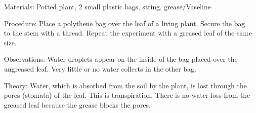 \begin{multicols}{2}
\begin{description*}
\item[Materials:]{Potted plant, 2 small plastic bags, string, grease/Vaseline}
\item[Procedure:]{Place a polythene bag over the leaf of a living plant. Secure the bag to the stem with a
thread. Repeat the experiment with a greased leaf of the same size.}
\item[Observations:]{Water droplets appear on the inside of the bag placed over the ungreased leaf. Very little
or no water collects in the other bag.}
\item[Theory:]{Water, which is absorbed from the soil by the plant, is lost through the pores (stomata) of the leaf. This is transpiration. There is no water loss from the greased leaf because the
grease blocks the pores.}
\end{description*}



\end{multicols}

\pagebreak